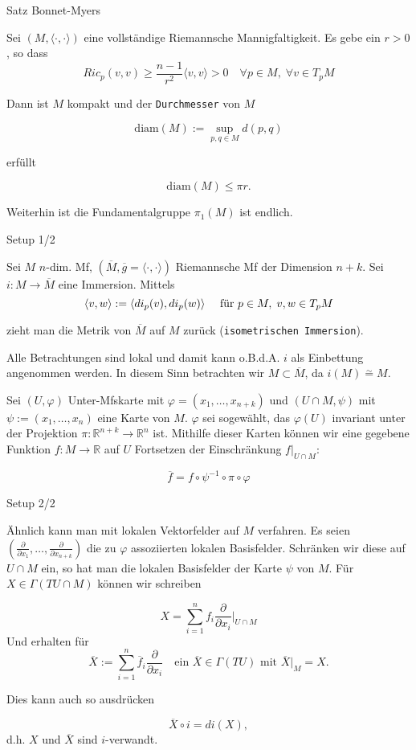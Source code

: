 \documentclass[a6paper,11pt,grid=front]{kartei}
\newcommand{\fl}[1]{\begin{flushleft}
 #1 \end{flushleft}}
\newcommand{\R}{\mathbb{R}}
\newcommand{\pd}[1][x_i]{\frac{\partial}{\partial {#1}}}
\newcommand{\blf}[1]{\langle #1 \rangle}
\newcounter{def}
\newcounter{satz}
\newcommand{\defreset}{\setcounter{def}{1}}
\newcommand{\satzreset}{\setcounter{satz}{1}}
\begin{document}
\nonameyet
{Satz} {Bonnet-Myers}
{
\small
Sei $(M,\blf{\cdot,\cdot})$ eine vollständige Riemannsche Mannigfaltigkeit. 
Es gebe ein $r > 0$, so dass
\[
Ric_p(v,v) \geq \frac{n-1}{r^2}\blf{v,v} > 0 
\quad \forall p\in M,
\; \forall v\in T_pM 
\]
\fl{Dann ist $M$ kompakt und der \texttt{Durchmesser} von $M$}
\[
\text{diam}(M) := \sup_{p,q \in M} d(p,q) 
\]
\fl{erfüllt }
\[
\text{diam}(M) \leq \pi r.
\]
\fl{Weiterhin ist die Fundamentalgruppe $\pi_1(M)$ ist endlich.}
}
{}

\defreset
\satzreset
{}
\newcommand{\M}[1][M]{\overline{#1}}


\nonameyet
{Setup } {1/2}
{
\scriptsize
Sei $M$ $n$-dim. Mf, $(\M,\M[g]=\blf{\cdot,\cdot})$ Riemannsche Mf der Dimension $n+k$.
Sei $i : M \to \M$ eine Immersion. Mittels 
\vspace{-1em}
\[
\blf{v,w} := \blf{di_p(v),di_p(w)} \quad \text{ für } p\in M, \; v,w \in T_pM
\vspace{-1em}
\]
\fl{zieht man die Metrik von $\M$ auf $M$ zurück 
(\texttt{isometrischen Immersion}).}
\fl{Alle Betrachtungen sind lokal und damit kann o.B.d.A. $i$ als Einbettung 
angenommen werden. In diesem Sinn betrachten wir $M \subset \M$, da 
$i(M) \overset{\sim}{=} M$.}

\fl{Sei $(U,\varphi)$ Unter-Mfskarte mit $\varphi = (x_1,\dots,x_{n+k})$
und $(U\cap M,\psi)$ mit $\psi:=(x_1,\dots,x_n)$ eine Karte von $M$. 
$\varphi$ sei sogewählt, das $\varphi(U)$ invariant unter der Projektion
$\pi : \R^{n+k} \to \R^n$ ist. Mithilfe dieser Karten können wir eine 
gegebene Funktion $f: M \to \R$ auf $U$ Fortsetzen der Einschränkung 
$f|_{U\cap M}:$}
\[
\M[f] = f\circ \psi ^{-1} \circ \pi \circ \varphi
\]
}
{}

\nonameyet
{Setup } {2/2}
{
	\scriptsize
\fl{Ähnlich kann man mit lokalen Vektorfelder auf $M$ verfahren. 
Es seien $(\pd[x_1],\dots,\pd[x_{n+k}])$ die zu $\varphi$ assoziierten lokalen
Basisfelder. Schränken wir diese auf $U\cap M$ ein, so hat man die lokalen 
Basisfelder der Karte $\psi$ von $M$. Für $X\in \Gamma(TU\cap M)$ können wir
schreiben}
\[
X = \sum_{i=1}^n f_i \pd[x_i]\bigg|_{U\cap M}
\]
Und erhalten für 
\[
\M[X] := \sum_{i=1}^n \M[f]_i \pd[x_i] \quad \text{ein } \M[X] \in \Gamma(TU)
\text{ mit }
\M[X]|_M = X .
\]
\fl{Dies kann auch so ausdrücken}
\[
\M[X] \circ i = di(X),
\]
d.h. $X$ und $\M[X]$ sind $i$-verwandt.
}
{}
\end{document}
